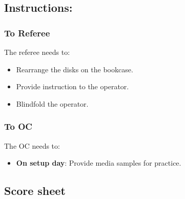 \subsection*{Instructions:}

\subsubsection*{To Referee}

The referee needs to:
\begin{itemize}
	\item Rearrange the disks on the bookcase.
	\item Provide instruction to the operator.
	\item Blindfold the operator.
\end{itemize}

\subsubsection*{To OC}
The OC needs to:
\begin{itemize}[nosep]
	\item \textbf{On setup day}: Provide media samples for practice.
\end{itemize}

\subsection*{Score sheet}


